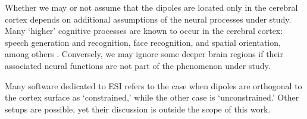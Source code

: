 Whether we may or not assume that the dipoles are located only in the cerebral cortex depends on additional assumptions of the neural processes under study.
%
Many `higher' cognitive processes are known to occur in the cerebral cortex: speech generation and recognition, face recognition, and spatial orientation, among others \cite{Saladin_Gan_2020}.
%
Conversely, we may ignore some deeper brain regions if their associated neural functions are not part of the phenomenon under study.

Many software dedicated to ESI refers to the case when dipoles are orthogonal to the cortex surface as `constrained,' while the other case is `unconstrained.' 
%
Other setups are possible, yet their discussion is outside the scope of this work.


